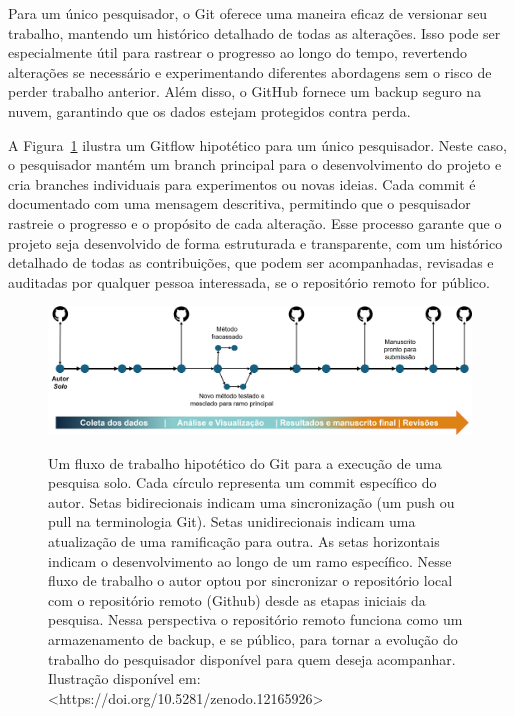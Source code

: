 \documentclass[
  a4paper,
]{book}
\begin{document}
Para um único pesquisador, o Git oferece uma maneira eficaz de versionar
seu trabalho, mantendo um histórico detalhado de todas as alterações.
Isso pode ser especialmente útil para rastrear o progresso ao longo do
tempo, revertendo alterações se necessário e experimentando diferentes
abordagens sem o risco de perder trabalho anterior. Além disso, o GitHub
fornece um backup seguro na nuvem, garantindo que os dados estejam
protegidos contra perda.

A Figura~\ref{fig-gitautorbegin} ilustra um Gitflow hipotético para um
único pesquisador. Neste caso, o pesquisador mantém um branch principal
para o desenvolvimento do projeto e cria branches individuais para
experimentos ou novas ideias. Cada commit é documentado com uma mensagem
descritiva, permitindo que o pesquisador rastreie o progresso e o
propósito de cada alteração. Esse processo garante que o projeto seja
desenvolvido de forma estruturada e transparente, com um histórico
detalhado de todas as contribuições, que podem ser acompanhadas,
revisadas e auditadas por qualquer pessoa interessada, se o repositório
remoto for público.

\begin{figure}

\href{https://doi.org/10.5281/zenodo.12165926}{\includegraphics{img/gitautorbegin.jpg}}

\caption{\label{fig-gitautorbegin}Um fluxo de trabalho hipotético do Git
para a execução de uma pesquisa solo. Cada círculo representa um commit
específico do autor. Setas bidirecionais indicam uma sincronização (um
push ou pull na terminologia Git). Setas unidirecionais indicam uma
atualização de uma ramificação para outra. As setas horizontais indicam
o desenvolvimento ao longo de um ramo específico. Nesse fluxo de
trabalho o autor optou por sincronizar o repositório local com o
repositório remoto (Github) desde as etapas iniciais da pesquisa. Nessa
perspectiva o repositório remoto funciona como um armazenamento de
backup, e se público, para tornar a evolução do trabalho do pesquisador
disponível para quem deseja acompanhar. Ilustração disponível em:
\textless https://doi.org/10.5281/zenodo.12165926\textgreater{}}

\end{figure}%
\end{document}
